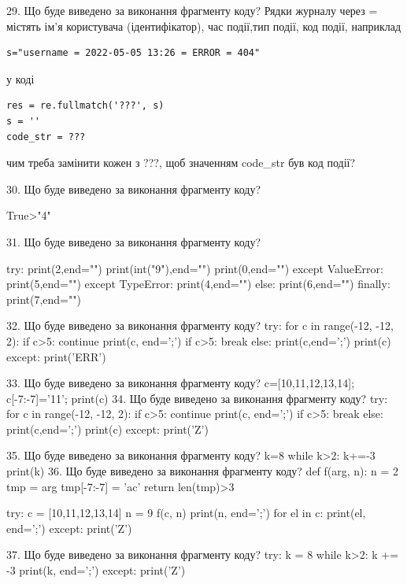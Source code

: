\documentclass[11pt]{article}
\begin{document}
29. Що буде виведено за виконання фрагменту коду?
Рядки журналу через = містять ім'я користувача (ідентифікатор), час події,тип події, код події, наприклад
\begin{verbatim}
s="username = 2022-05-05 13:26 = ERROR = 404"
\end{verbatim}
у коді 
\begin{verbatim}
res = re.fullmatch('???', s) 
s = ''
code_str = ??? 
\end{verbatim}
чим треба замінити кожен з ???, щоб значенням code\_str був код події? 



30. Що буде виведено за виконання фрагменту коду?

True>"4"

31. Що буде виведено за виконання фрагменту коду?

try:
    print(2,end="")
    print(int("9"),end="")
    print(0,end="")
except ValueError: print(5,end="")
except TypeError: print(4,end="")
else: print(6,end="")
finally: print(7,end="")


32. Що буде виведено за виконання фрагменту коду?
try:
    for c in range(-12, -12, 2):
        if c>5:
            continue
        print(c, end=';')
        if c>5:
            break
    else:
        print(c,end=';')
    print(c)
except:
    print('ERR')

33. Що буде виведено за виконання фрагменту коду?
c=[10,11,12,13,14]; c[-7:-7]='11'; print(c)
34. Що буде виведено за виконання фрагменту коду?
try:
    for c in range(-12, -12, 2):
        if c>5:
            continue
        print(c, end=';')
        if c>5:
            break
    else:
        print(c,end=';')
    print(c)
except:
    print('Z')

35. Що буде виведено за виконання фрагменту коду?
k=8
   while k>2: k+=-3
   print(k)
36. Що буде виведено за виконання фрагменту коду?
def f(arg, n):
    n = 2
    tmp = arg
    tmp[-7:-7] = 'ac'
    return len(tmp)>3

try:
    c = [10,11,12,13,14]
    n = 9
    f(c, n)
    print(n, end=';')
    for el in c:
        print(el, end=';')
except:
    print('Z')

37. Що буде виведено за виконання фрагменту коду?
try:
    k = 8
    while k>2:
        k += -3
    print(k, end=';')
except:
    print('Z')
\end{document}
